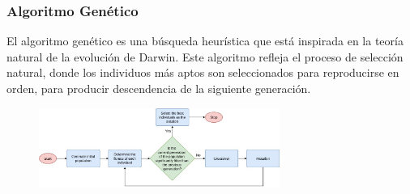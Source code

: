 \documentclass{beamer}
\begin{document}
\begin{frame}
    \frametitle{Algoritmo Genético}
    El algoritmo genético es una búsqueda heurística que está inspirada en la teoría natural de la evolución de Darwin. Este algoritmo refleja el proceso de selección natural, donde los individuos más aptos son seleccionados para reproducirse en orden, para producir descendencia de la siguiente generación.
    
    \begin{figure}
        \centering
        \includegraphics[width=0.7\textwidth]{Imagenes/AG_flowchart.jpg}
    \end{figure}
\end{frame}
\end{document}
